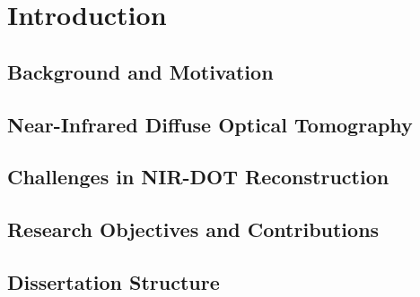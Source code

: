 
\chapter{Introduction}

\section{Background and Motivation}

\section{Near-Infrared Diffuse Optical Tomography}

\section{Challenges in NIR-DOT Reconstruction}

\section{Research Objectives and Contributions}

\section{Dissertation Structure}

